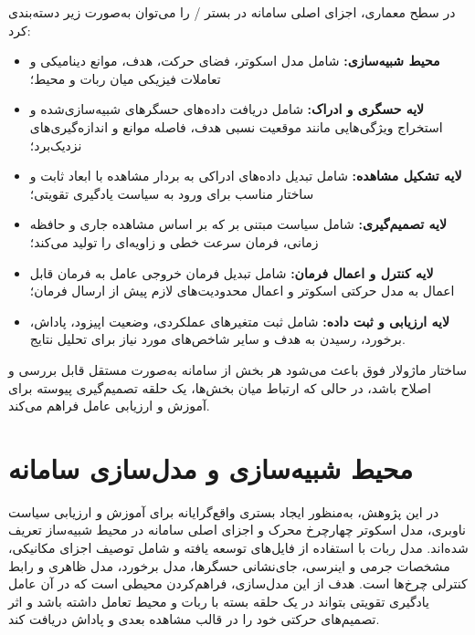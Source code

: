 در سطح معماری، اجزای اصلی سامانه در بستر / را می‌توان به‌صورت زیر دسته‌بندی کرد:
\begin{itemize}
	\item \textbf{محیط شبیه‌سازی:} شامل مدل اسکوتر، فضای حرکت، هدف، موانع دینامیکی و تعاملات فیزیکی میان ربات و محیط؛
	
	\item \textbf{لایه حسگری و ادراک:} شامل دریافت داده‌های حسگرهای شبیه‌سازی‌شده و استخراج ویژگی‌هایی مانند موقعیت نسبی هدف، فاصله موانع و اندازه‌گیری‌های نزدیک‌برد؛
	
	\item \textbf{لایه تشکیل مشاهده:} شامل تبدیل داده‌های ادراکی به بردار مشاهده با ابعاد ثابت و ساختار مناسب برای ورود به سیاست یادگیری تقویتی؛
	
	\item \textbf{لایه تصمیم‌گیری:} شامل سیاست مبتنی بر  که بر اساس مشاهده جاری و حافظه زمانی، فرمان سرعت خطی و زاویه‌ای را تولید می‌کند؛
	
	\item \textbf{لایه کنترل و اعمال فرمان:} شامل تبدیل فرمان خروجی عامل به فرمان قابل اعمال به مدل حرکتی اسکوتر و اعمال محدودیت‌های لازم پیش از ارسال فرمان؛
	
	\item \textbf{لایه ارزیابی و ثبت داده:} شامل ثبت متغیرهای عملکردی، وضعیت اپیزود، پاداش، برخورد، رسیدن به هدف و سایر شاخص‌های مورد نیاز برای تحلیل نتایج.
	
\end{itemize}

ساختار ماژولار فوق باعث می‌شود هر بخش از سامانه به‌صورت مستقل قابل بررسی و اصلاح باشد، در حالی که ارتباط میان بخش‌ها، یک حلقه تصمیم‌گیری پیوسته برای آموزش و ارزیابی عامل فراهم می‌کند.


\section{محیط شبیه‌سازی و مدل‌سازی سامانه}
\label{sec:simulation_environment_modeling}

در این پژوهش، به‌منظور ایجاد بستری واقع‌گرایانه برای آموزش و ارزیابی سیاست ناوبری، مدل اسکوتر چهارچرخ محرک و اجزای اصلی سامانه در محیط شبیه‌ساز  تعریف شده‌اند. مدل ربات با استفاده از فایل‌های  توسعه یافته و شامل توصیف اجزای مکانیکی، مشخصات جرمی و اینرسی، جای‌نشانی حسگرها، مدل برخورد، مدل ظاهری و رابط کنترلی چرخ‌ها است. هدف از این مدل‌سازی، فراهم‌کردن محیطی است که در آن عامل یادگیری تقویتی بتواند در یک حلقه بسته با ربات و محیط تعامل داشته باشد و اثر تصمیم‌های حرکتی خود را در قالب مشاهده بعدی و پاداش دریافت کند.

